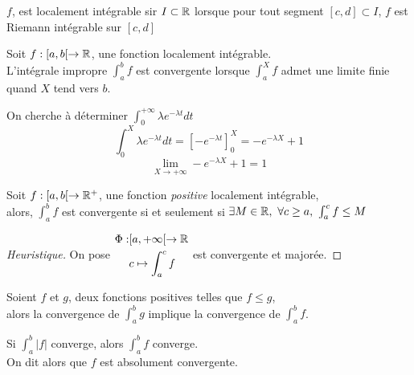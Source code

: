 \documentclass[../main.tex]{subfile}
\begin{document}
\begin{defi}
	$f$, est localement intégrable sir $ I \subset \mathbb{R}$ lorsque pour tout segment $[c, d] \subset I$, $f$ est Riemann intégrable sur $[c, d]$
\end{defi}

\begin{defi}
	Soit $f: [a, b[ \to \mathbb{R}$, une fonction localement intégrable.\\
	L'intégrale impropre $\int_a^b f$ est convergente lorsque $\int_a^X f$ admet une limite finie quand $X$ tend vers $b$. %
\end{defi}

\begin{ex}
	On cherche à déterminer $\int_0^{+\infty} \lambda e^{-\lambda t} dt$\\
	$$\int_0^X \lambda e^{-\lambda t} dt = \left[ -e^{-\lambda t} \right]_0^X = -e^{-\lambda X} + 1$$
	$$\lim\limits_{X \to +\infty} -e^{-\lambda X} + 1 = 1$$
\end{ex}















\begin{theo}
	Soit $f : [a, b[ \to \mathbb{R}^+$, une fonction \emph{positive} localement intégrable, \\
	alors, $\int_a^b f$ est convergente si et seulement si $\exists M \in \mathbb{R}, \ \forall c \geq a, \ \int_a^c f \leq M$
\end{theo}

\begin{proof}[Heuristique]
	On pose $
	\begin{aligned}
	\Phi :& [a, +\infty[ \to \mathbb{R}\\
	& c \mapsto \int_a^c f	
	\end{aligned}$
	est convergente et majorée.
\end{proof}

\begin{coroll}
	Soient $f$ et $g$, deux fonctions positives telles que $f \leq g$, \\
	alors la convergence de $\int_a^b g$ implique la convergence de $\int_a^b f$.
\end{coroll}

\begin{theo}
	Si $\int_a^b |f|$ converge, alors $\int_a^b f$ converge.\\
	On dit alors que $f$ est absolument convergente.
\end{theo}
\end{document}
